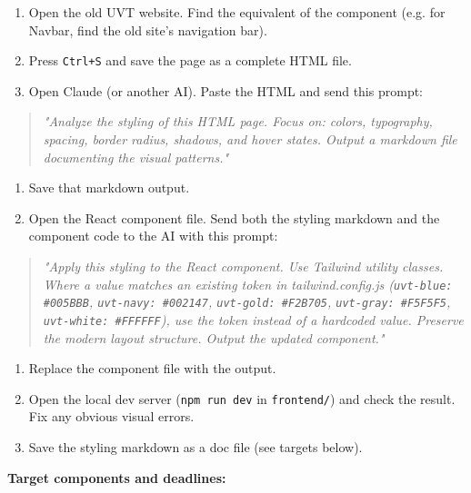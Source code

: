 \documentclass[11pt,a4paper]{article}
\begin{document}
\begin{enumerate}
\item Open the old UVT website. Find the equivalent of the component (e.g. for Navbar, find the old site's navigation bar).
\item Press \nolinkurl{Ctrl+S} and save the page as a complete HTML file.
\item Open Claude (or another AI). Paste the HTML and send this prompt:
\end{enumerate}
\begin{quote}\itshape
"Analyze the styling of this HTML page. Focus on: colors, typography, spacing, border radius, shadows, and hover states. Output a markdown file documenting the visual patterns."
\end{quote}
\begin{enumerate}
\item Save that markdown output.
\item Open the React component file. Send both the styling markdown and the component code to the AI with this prompt:
\end{enumerate}
\begin{quote}\itshape
"Apply this styling to the React component. Use Tailwind utility classes. Where a value matches an existing token in tailwind.config.js (\nolinkurl{uvt-blue: #005BBB}, \nolinkurl{uvt-navy: #002147}, \nolinkurl{uvt-gold: #F2B705}, \nolinkurl{uvt-gray: #F5F5F5}, \nolinkurl{uvt-white: #FFFFFF}), use the token instead of a hardcoded value. Preserve the modern layout structure. Output the updated component."
\end{quote}
\begin{enumerate}
\item Replace the component file with the output.
\item Open the local dev server (\nolinkurl{npm run dev} in \nolinkurl{frontend/}) and check the result. Fix any obvious visual errors.
\item Save the styling markdown as a doc file (see targets below).
\end{enumerate}

\textbf{Target components and deadlines:}
\end{document}
